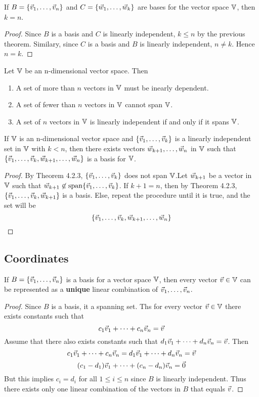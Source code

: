 \documentclass[english,12pt]{article}
\begin{document}
\begin{thrm}
If $B = \{\vec{v}_1,\dots,\vec{v}_n\}$ and $C = \{ \vec{w}_1,\dots,\vec{w}_k\}$ are bases for the vector space ${\mathbb{V}}$, then $k = n$.

\begin{proof}
Since $B$ is a basis and $C$ is linearly independent, $k \leq n$ by the previous theorem. Similary, since $C$ is a basis and $B$ is linearly independent, $n \neq k$. Hence $n = k$.
\end{proof}
\end{thrm}

\begin{thrm}
Let ${\mathbb{V}}$ be an n-dimensional vector space. Then

\begin{enumerate}
\item A set of more than $n$ vectors in ${\mathbb{V}}$ must be inearly dependent.
\item A set of fewer than $n$ vectors in ${\mathbb{V}}$ cannot span ${\mathbb{V}}$.
\item A set of $n$ vectors in ${\mathbb{V}}$ is linearly independent if and only if it spans ${\mathbb{V}}$.
\end{enumerate}
\end{thrm}

\begin{thrm}
If ${\mathbb{V}}$ is an n-dimensional vector space and $\{\vec{v}_1,\dots,\vec{v}_k\}$ is a linearly independent set in ${\mathbb{V}}$ with $k < n$, then there exists vectors $\vec{w}_{k+1},\dots,\vec{w}_{n}$ in ${\mathbb{V}}$ such that $\{\vec{v}_1,\dots,\vec{v}_k,\vec{w}_{k+1},\dots,\vec{w}_n\}$ is a basis for ${\mathbb{V}}$.

\begin{proof}
By Theorem 4.2.3, $\{\vec{v}_1,\dots,\vec{v}_k\}$ does not span ${\mathbb{V}}$.Let $\vec{w}_{k+1}$ be a vector in ${\mathbb{V}}$ such that $\vec{w}_{k+1} \not \in \operatorname{span}\{\vec{v}_1,\dots,\vec{v}_k\}$. If $k+1 = n$, then by Theorem 4.2.3, $\{\vec{v}_1,\dots,\vec{v}_k,\vec{w}_{k+1}\}$ is a basis. Else, repeat the procedure until it is true, and the set will be
\[\{\vec{v}_1,\dots,\vec{v}_k,\vec{w}_{k+1},\dots,\vec{w}_n\}\]
\end{proof}
\end{thrm}

\subsection{Coordinates}

\begin{thrm}
If $B = \{\vec{v}_1,\dots,\vec{v}_n\}$ is a basis for a vector space ${\mathbb{V}}$, then every vector $\vec{v} \in {\mathbb{V}}$ can be represented as a \textbf{unique} linear combination of $\vec{v}_1,\dots,\vec{v}_n$.
\begin{proof}
Since $B$ is a basis, it a spanning set. Ths for every vector $\vec{v} \in {\mathbb{V}}$ there exists constants such that
\[c_1 \vec{v}_1 + \cdots + c_n \vec{v}_n = \vec{v}\]
Assume that there also exists constants such that $d_1 \vec{v}_1 + \cdots + d_n \vec{v}_n = \vec{v}$. Then
\[c_1 \vec{v}_1 + \cdots + c_n \vec{v}_n = d_1 \vec{v}_1 + \cdots + d_n \vec{v}_n = \vec{v}\]
\[(c_1 - d_1) \vec{v}_1 + \cdots + (c_n - d_n)\vec{v}_n = \vec{0}\]
But this implies $c_i = d_i$ for all $1 \leq i \leq n$ since $B$ is linearly independent. Thus there exists only one linear combination of the vectors in $B$ that equals $\vec{v}$.
\end{proof}
\end{thrm}
\end{document}
